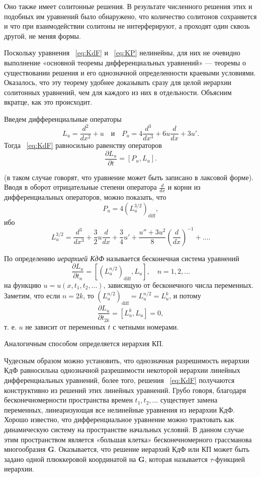\documentclass{article}
\theoremstyle{definition}
\theoremstyle{definition} %
\theoremstyle{remark}     %
\theoremstyle{definition}
\theoremstyle{definition}
\theoremstyle{definition}
\theoremstyle{definition}
\theoremstyle{definition}
\theoremstyle{definition}
\theoremstyle{definition}
\theoremstyle{definition}
\begin{document}
Оно также имеет солитонные решения. В результате численного решения этих и подобных им уравнений было обнаружено, что количество солитонов сохраняется и что при взаимодействии солитоны не интерферируют, а проходят один сквозь другой, не меняя формы.

Поскольку уравнения ~\ref{eq:KdF} и ~\ref{eq:KP} нелинейны, для них не очевидно выполнение «основной теоремы дифференциальных уравнений» --- теоремы о существовании решения и его однозначной определенности краевыми условиями. Оказалось, что эту теорему удобнее доказывать сразу для целой иерархии солитонных уравнений, чем для каждого из них в отдельности. Объясним вкратце, как это происходит.

Введем дифференциальные операторы
\[
L_u = \frac{d^2}{dx^2} + u \quad \text{и} \quad P_u = 4\frac{d^3}{dx^3} + 6u\frac{d}{dx} + 3u'.
\]
Тогда ~\ref{eq:KdF} равносильно равенству операторов
\[
\frac{\partial L_u}{\partial t} = [P_u, L_u].
\]

(в таком случае говорят, что уравнение может быть записано в лаксовой форме). Вводя в оборот отрицательные степени оператора \(\frac{d}{dx}\) и корни из дифференциальных операторов, можно показать, что
\[
P_u = 4 \left(L_u^{3/2}\right)_{\text{diff}},
\]
ибо
\[
L_u^{3/2} = \frac{d^3}{dx^3} + \frac{3}{2}u\frac{d}{dx} + \frac{3}{4}u' + \frac{u'' + 3u^2}{8}\left(\frac{d}{dx}\right)^{-1} + \dots .
\]

По определению \emph{иерархией КдФ} называется бесконечная система уравнений
\[
\frac{\partial L_u}{\partial t_n} = \left[\left(L_u^{n/2}\right)_{\text{diff}}, L_u\right], \quad n = 1, 2, \dots
\]
на функцию \(u = u(x, t_1, t_2, \dots)\), зависящую от бесконечного числа переменных. Заметим, что если \(n = 2k\), то \(\left(L_u^{n/2}\right)_{\text{diff}} = L_u^{n/2} = L_u^k\), и потому
\[
\frac{\partial L_u}{\partial t_{2k}} = \left[L_u^k, L_u\right] = 0,
\]
т. е. \(u\) не зависит от переменных \(t\) с четными номерами.

Аналогичным способом определяется иерархия КП.

Чудесным образом можно установить, что однозначная разрешимость иерархии КдФ равносильна однозначной разрешимости некоторой иерархии линейных дифференциальных уравнений, более того, решения ~\ref{eq:KdF} получаются конструктивно из решений этих линейных уравнений. Грубо говоря, благодаря бесконечномерности пространства времен \(t_1, t_2, \dots\) существует замена переменных, линеаризующая все нелинейные уравнения из иерархии КдФ. Хорошо известно, что дифференциальное уравнение можно трактовать как динамическую систему на пространстве начальных условий. В данном случае этим пространством является «большая клетка» бесконечномерного грассманова многообразия \(\mathbf{G}\). Оказывается, что решение иерархий КдФ или КП может быть задано одной плюккеровой координатой на \(\mathbf{G}\), которая называется \(\tau\)-функцией иерархии.
\end{document}
